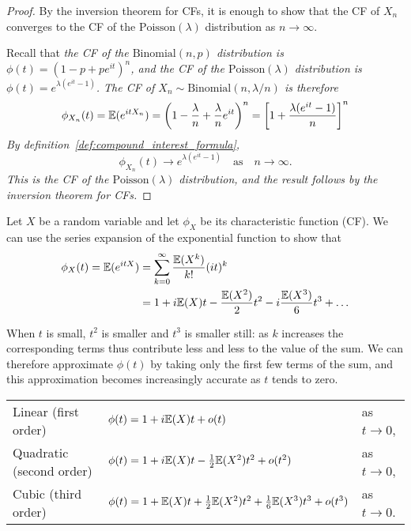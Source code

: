 \begin{proof}
By the inversion theorem for CFs, it is enough to show that the CF of $X_n$ converges to the CF of the $\text{Poisson}(\lambda)$ distribution as $n\to\infty$. 

\bigskip
Recall that
\bit
\it the CF of the $\text{Binomial}(n,p)$ distribution is $\phi(t)=(1-p+pe^{it})^n$, and
\it the CF of the $\text{Poisson}(\lambda)$ distribution is $\phi(t)=e^{\lambda(e^{it}-1)}$.
\eit
The CF of $X_n\sim\text{Binomial}(n,\lambda/n)$ is therefore
\[
\phi_{X_n}(t) 
	= \mathbb{E}(e^{itX_n}) 
	= \left(1-\frac{\lambda}{n} + \frac{\lambda}{n}e^{it}\right)^n
	= \left[1 + \frac{\lambda(e^{it}-1)}{n}\right]^n
\]
By definition~\ref{def:compound_interest_formula},
\[
\phi_{X_n}(t) \to e^{\lambda(e^{it}-1)}\quad\text{as}\quad n\to\infty.
\]
This is the CF of the $\text{Poisson}(\lambda)$ distribution, and the result follows by the inversion theorem for CFs.
\end{proof}

Let $X$ be a random variable and let $\phi_X$ be its characteristic function (CF). We can use the series expansion of the exponential function to show that
\begin{align*}
\phi_X(t) 
	= \mathbb{E}(e^{itX})
	& = \sum_{k=0}^{\infty} \frac{\mathbb{E}(X^k)}{k!}(it)^k \\
	& = 1 + i\mathbb{E}(X)t - \frac{\mathbb{E}(X^2)}{2}t^2 -i\frac{\mathbb{E}(X^3)}{6}t^3 + \ldots
\end{align*}

When $t$ is small, $t^2$ is smaller and $t^3$ is smaller still: as $k$ increases the corresponding terms thus contribute less and less to the value of the sum. We can therefore approximate $\phi(t)$ by taking only the first few terms of the sum, and this approximation becomes increasingly accurate as $t$ tends to zero.

\bigskip
\begin{tabular}{lll}\hline
Linear (first order)	& $\phi(t) =	1 + i\mathbb{E}(X)t + o(t)$ 								& as $t\to 0$, \\
Quadratic (second order)& $\phi(t) =	1 + i\mathbb{E}(X)t - \frac{1}{2}\mathbb{E}(X^2)t^2 + o(t^2)$ 	& as $t\to 0$, \\
Cubic (third order) 	& $\phi(t) =	1 + \mathbb{E}(X)t + \frac{1}{2}\mathbb{E}(X^2)t^2 + \frac{1}{6}\mathbb{E}(X^3)t^3 + o(t^3)$ & as $t\to 0$. \\ \hline
\end{tabular}
\bigskip

